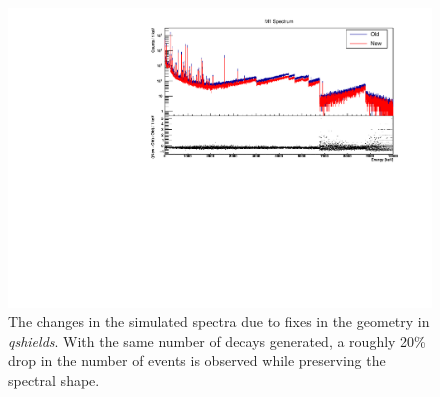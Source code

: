 \begin{figure}
    \centering
    \includegraphics[width=0.8\linewidth]{Figures/PTFESx_M1.pdf}
    \caption[The changes in the simulated spectra due to fixes in the geometry in \textit{qshields}.]
    {The changes in the simulated spectra due to fixes in the geometry in \textit{qshields}.
    With the same number of decays generated, a roughly 20\% drop in the number of events is observed while preserving the spectral shape.}
    \label{fig:PTFESx_M1}
\end{figure}